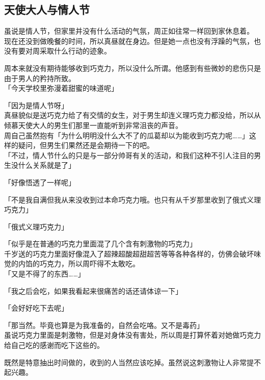 \subsection{天使大人与情人节}

虽说是情人节，但家里并没有什么活动的气氛，周正如往常一样回到家休息着。\\

现在还没到做晚餐的时间，所以真昼就在身边。但是她一点也没有浮躁的气氛，也没有要对周采取什么行动的迹象。

周本来就没有期待能够收到巧克力，所以没什么所谓。他感到有些微妙的悲伤只是由于男人的矜持所致。\\

「今天学校里弥漫着甜蜜的味道呢」

「因为是情人节呀」\\

真昼貌似是送巧克力给了有交情的女生，对于男生却连义理巧克力都没给，所以从倾慕天使大人的男生们那里一直能听到非常沮丧的声音。\\

周自己虽然抱有「为什么明明没什么大不了的瓜葛却以为能收到巧克力呢……」这样的疑问，但男生们果然还是会期待一下的吧。\\

「不过，情人节什么的只是与一部分帅哥有关的活动，和我们这种不引人注目的男生没什么关系就是了」

「好像悟透了一样呢」

「不是我自满但我从来没收到过本命巧克力哦。也只有从千岁那里收到了俄式义理巧克力」

「俄式义理巧克力」

「似乎是在普通的巧克力里面混了几个含有刺激物的巧克力」\\

千岁送的巧克力里面好像混入了超辣超酸超甜超苦等等各种各样的，仿佛会破坏味觉的内馅的巧克力，所以周吓得不太敢吃。\\

「又是不得了的东西……」

「我之后会吃，如果我看起来很痛苦的话还请体谅一下」

「会好好吃下去呢」

「那当然。毕竟也算是为我准备的，自然会吃咯。又不是毒药」\\

虽说巧克力里面是刺激物，但是对身体没有害处，所以周是打算怀着对她做巧克力给自己吃的感谢而吃下这些的。

既然是特意抽出时间做的，收到的人当然应该吃掉。虽然说这刺激物让人非常提不起兴趣。\\

